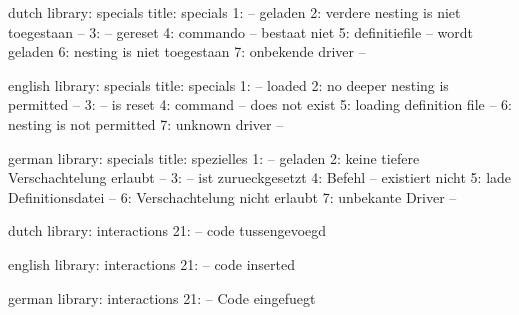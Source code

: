 


\unprotect

\startmessages  dutch  library: specials
  title: specials
      1: -- geladen
      2: verdere nesting is niet toegestaan --
      3: -- gereset
      4: commando -- bestaat niet
      5: definitiefile -- wordt geladen
      6: nesting is niet toegestaan
      7: onbekende driver --
\stopmessages

\startmessages  english  library: specials
  title: specials
      1: -- loaded
      2: no deeper nesting is permitted --
      3: -- is reset
      4: command -- does not exist
      5: loading definition file --
      6: nesting is not permitted
      7: unknown driver --
\stopmessages

\startmessages  german  library: specials
  title: spezielles
      1: -- geladen
      2: keine tiefere Verschachtelung erlaubt --
      3: -- ist zurueckgesetzt
      4: Befehl -- existiert nicht
      5: lade Definitionsdatei --
      6: Verschachtelung nicht erlaubt
      7: unbekante Driver --
\stopmessages

\startmessages  dutch  library: interactions
     21: -- code tussengevoegd
\stopmessages

\startmessages  english  library: interactions
     21: -- code inserted
\stopmessages

\startmessages  german  library: interactions
     21: -- Code eingefuegt
\stopmessages


\newevery \everyresetspecials \relax

